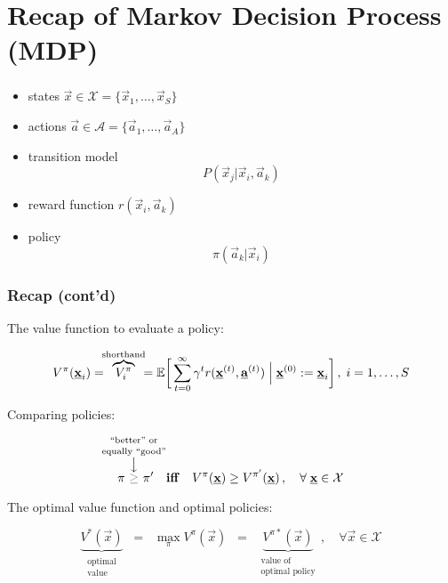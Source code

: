 \section{Recap of Markov Decision Process (MDP)}

\begin{frame}\frametitle{\secname}

\begin{itemize}
\item[] states $\vec x \in \mathcal{X} = \{ \vec x_1, \ldots, \vec x_S\}$
\item[] actions $\vec a \in \mathcal{A} = \{ \vec a_1, \ldots, \vec a_A\}$
\item[] transition model
\begin{equation}
P(\vec x_j | \vec x_i, \vec a_k)
\end{equation}
\pause
\item[] reward function $r(\vec x_i, \vec a_k)$
\item[] policy 
\begin{equation}
\pi(\vec a_k | \vec x_i)
\end{equation}

\end{itemize}

\end{frame}

\begin{frame}\frametitle{Recap (cont'd)}

The value function to evaluate a policy:

	\begin{align}
	V^\pi(\underline{\mathbf{x}}_i) = \kern-1ex \overbrace{V^\pi_i}^{\text{shorthand}} \kern-1ex = 
	\mathbb{E} \bigg\lbrack
	\sum_{t=0}^{\infty} \gamma^t r(\underline{\mathbf{x}}^{(t)}, \underline{\mathbf{a}}^{(t)}) \;\Big|\; \underline{\mathbf{x}}^{(0)} := \underline{\mathbf{x}}_i
	\bigg\rbrack\,, \; i=1,\ldots,S
	\end{align}
	
	
Comparing policies:

\begin{equation}
\pi~
\overset{\mathclap{\substack{%
					\text{``better'' or}\\[1mm]\text{equally ``good''}\\ \big\downarrow
					}}}{{\color{gray}\ge}}
~\pi' 
\quad \text{\textbf{iff}} \quad V^{\pi} (\vec x) \ge V^{\pi'} (\vec x)\,,\quad \forall\; \vec x \in \mathcal{X}
\end{equation}

The optimal value function and optimal policies:

\begin{equation}
\underbrace{V^{*}(\vec x)}_{\substack{\text{optimal}\\ \text{value}}} \;\;=\;\; \max_{\pi} V^{\pi} (\vec x) \;\;=\;\; \underbrace{V^{\pi*}(\vec x)}_{\substack{\text{value of}\\ \text{optimal policy}}}\,,\quad \forall \vec x \in \mathcal{X}
\end{equation}

\end{frame}


